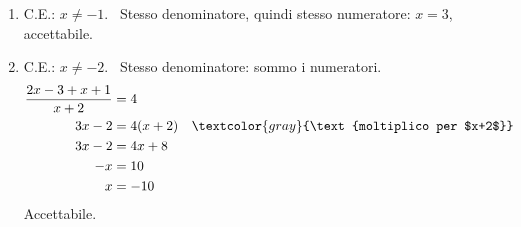 \begin{question}[ID=3.4, subtitle={Equazioni frazionarie}, difficulty=media, tags={equazioni frazionarie}]
\begin{explanation}
\begin{enumerate}
    \item C.E.: $x\neq-1$. \ Stesso denominatore, quindi stesso numeratore: $x=3$, accettabile.
    \item C.E.: $x\neq-2$. \ Stesso denominatore: sommo i numeratori.
    \[\begin{aligned}
    \dfrac{2x-3+x+1}{x+2} &= 4\\
    3x-2 &= 4(x+2) && \textcolor{gray}{\text{moltiplico per $x+2$}}\\
    3x-2 &= 4x+8\\
    -x &= 10\\
    x &= -10
    \end{aligned}\]
    Accettabile.
\end{enumerate}
\end{explanation}
\end{question}


